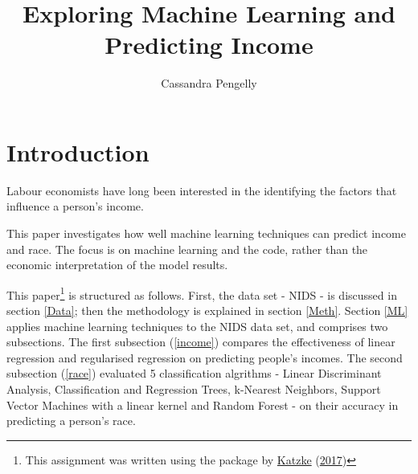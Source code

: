 \documentclass[11pt,preprint, authoryear]{elsarticle}
\numberwithin{equation}{section}
\numberwithin{figure}{section}
\numberwithin{table}{section}
\let\rmarkdownfootnote\footnote%
\def\footnote{\protect\rmarkdownfootnote}
\begin{document}
\begin{frontmatter}  %

\title{Exploring Machine Learning and Predicting Income}





\author[Add1]{Cassandra Pengelly}








\vspace{1cm}





\vspace{0.5cm}

\end{frontmatter}



\pagestyle{fancy}
\chead{}
\rhead{}
\lfoot{}
\lhead{}
\cfoot{}


\headsep 35pt %




\hypertarget{introduction}{%
\section{\texorpdfstring{Introduction
\label{Introduction}}{Introduction }}\label{introduction}}

Labour economists have long been interested in the identifying the
factors that influence a person's income.

This paper investigates how well machine learning techniques can predict
income and race. The focus is on machine learning and the code, rather
than the economic interpretation of the model results.

This paper\footnote{This assignment was written using the package by
  \protect\hyperlink{ref-Texevier}{Katzke}
  (\protect\hyperlink{ref-Texevier}{2017})} is structured as follows.
First, the data set - NIDS - is discussed in section \ref{Data}; then
the methodology is explained in section \ref{Meth}. Section \ref{ML}
applies machine learning techniques to the NIDS data set, and comprises
two subsections. The first subsection (\ref{income}) compares the
effectiveness of linear regression and regularised regression on
predicting people's incomes. The second subsection (\ref{race})
evaluated 5 classification algrithms - Linear Discriminant Analysis,
Classification and Regression Trees, k-Nearest Neighbors, Support Vector
Machines with a linear kernel and Random Forest - on their accuracy in
predicting a person's race.
\end{document}
